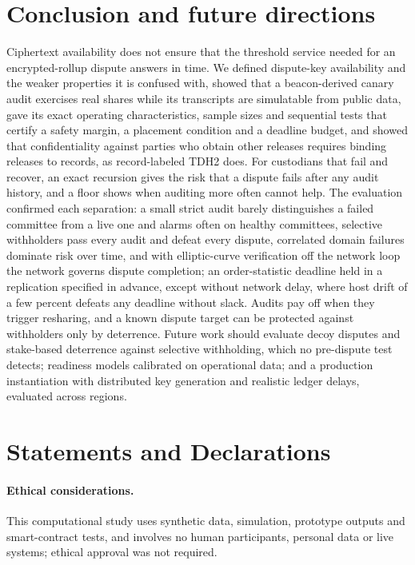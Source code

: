 \documentclass[Crown,sagev]{sagej}
\theoremstyle{plain}
\theoremstyle{definition}
\theoremstyle{remark}
\begin{document}
\section{Conclusion and future directions}\label{sec:conclusion}

Ciphertext availability does not ensure that the threshold service needed for an encrypted-rollup dispute answers in time. We defined dispute-key availability and the weaker properties it is confused with, showed that a beacon-derived canary audit exercises real shares while its transcripts are simulatable from public data, gave its exact operating characteristics, sample sizes and sequential tests that certify a safety margin, a placement condition and a deadline budget, and showed that confidentiality against parties who obtain other releases requires binding releases to records, as record-labeled TDH2 does. For custodians that fail and recover, an exact recursion gives the risk that a dispute fails after any audit history, and a floor shows when auditing more often cannot help. The evaluation confirmed each separation: a small strict audit barely distinguishes a failed committee from a live one and alarms often on healthy committees, selective withholders pass every audit and defeat every dispute, correlated domain failures dominate risk over time, and with elliptic-curve verification off the network loop the network governs dispute completion; an order-statistic deadline held in a replication specified in advance, except without network delay, where host drift of a few percent defeats any deadline without slack. Audits pay off when they trigger resharing, and a known dispute target can be protected against withholders only by deterrence. Future work should evaluate decoy disputes and stake-based deterrence against selective withholding, which no pre-dispute test detects; readiness models calibrated on operational data; and a production instantiation with distributed key generation and realistic ledger delays, evaluated across regions.

\section*{Statements and Declarations}

\paragraph*{Ethical considerations.}This computational study uses synthetic data, simulation, prototype outputs and smart-contract tests, and involves no human participants, personal data or live systems; ethical approval was not required.
\end{document}
